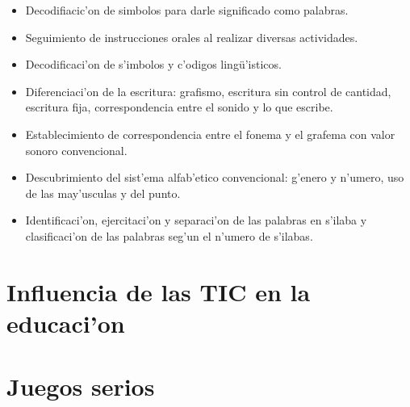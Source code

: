\begin{itemize}
	\item Decodifiacic'on de simbolos para darle significado como palabras.
	\item Seguimiento de instrucciones orales al realizar diversas actividades.
	\item Decodificaci'on de s'imbolos y c'odigos ling\"{u}'isticos.
	\item Diferenciaci'on de la escritura: grafismo, escritura sin control de cantidad, escritura fija, correspondencia entre el sonido y lo que escribe.
	\item Establecimiento de correspondencia entre el fonema y el grafema con valor sonoro convencional.
	\item Descubrimiento del sist'ema alfab'etico convencional: g'enero y n'umero, uso de las may'usculas y del punto.
	\item Identificaci'on, ejercitaci'on y separaci'on de las palabras en s'ilaba y clasificaci'on de las palabras seg'un el n'umero de s'ilabas.
\end{itemize}

\section{Influencia de las TIC en la educaci'on}


\section{Juegos serios}




